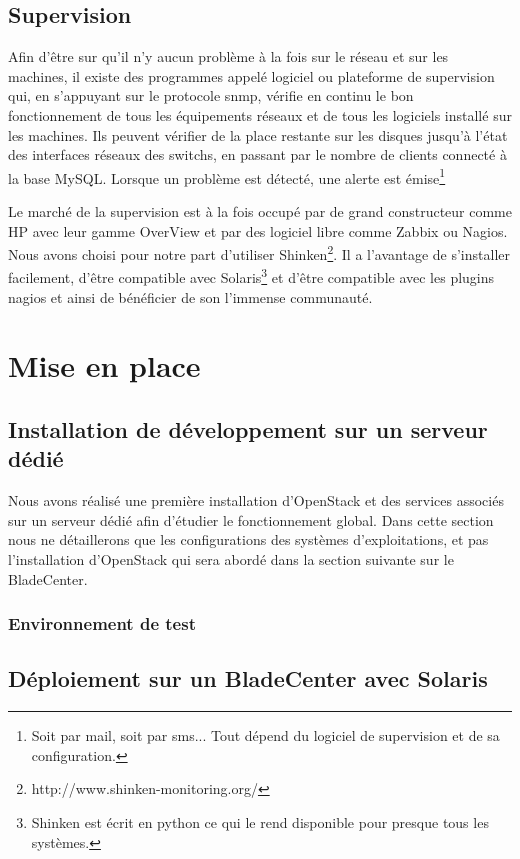 \documentclass[a4paper,oneside]{report}
\begin{document}
\section{Supervision}
Afin d'être sur qu'il n'y aucun problème à la fois sur le réseau et sur les machines, il existe des programmes appelé logiciel ou plateforme de supervision qui, en s'appuyant sur le protocole snmp, vérifie en continu le bon fonctionnement de tous les équipements réseaux et de tous les logiciels installé sur les machines.
Ils peuvent vérifier de la place restante sur les disques jusqu'à l'état des interfaces réseaux des switchs, en passant par le nombre de clients connecté à la base MySQL.
Lorsque un problème est détecté, une alerte est émise\footnote{Soit par mail, soit par sms... Tout dépend du logiciel de supervision et de sa configuration.}

Le marché de la supervision est à la fois occupé par de grand constructeur comme HP avec leur gamme OverView et par des logiciel libre comme Zabbix ou Nagios.
Nous avons choisi pour notre part d'utiliser Shinken\footnote{http://www.shinken-monitoring.org/}.
Il a l'avantage de s'installer facilement, d'être compatible avec Solaris\footnote{Shinken est écrit en python ce qui le rend disponible pour presque tous les systèmes.} et d'être compatible avec les plugins nagios et ainsi de bénéficier de son l'immense communauté.

\chapter{Mise en place}
\section{Installation de développement sur un serveur dédié}
Nous avons réalisé une première installation d'OpenStack et des services associés sur un serveur dédié afin d'étudier le fonctionnement global.
Dans cette section nous ne détaillerons que les configurations des systèmes d'exploitations, et pas l'installation d'OpenStack qui sera abordé dans la section suivante sur le BladeCenter.

\subsection{Environnement de test}

\section{Déploiement sur un BladeCenter avec Solaris}
\end{document}
